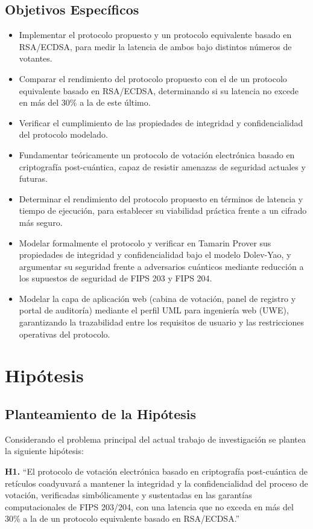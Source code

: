 \subsection{Objetivos Específicos}
\begin{itemize}
	\item Implementar el protocolo propuesto y un protocolo equivalente basado en RSA/ECDSA, para medir la latencia de ambos bajo distintos números de votantes.
	\item Comparar el rendimiento del protocolo propuesto con el de un protocolo equivalente basado en RSA/ECDSA, determinando si su latencia no excede en más del 30\% a la de este último.
	\item Verificar el cumplimiento de las propiedades de integridad y confidencialidad del protocolo modelado.
	\item Fundamentar teóricamente un protocolo de votación electrónica basado en criptografía post-cuántica, capaz de resistir amenazas de seguridad actuales y futuras.
	\item Determinar el rendimiento del protocolo propuesto en términos de latencia y tiempo de ejecución, para establecer su viabilidad práctica frente a un cifrado más seguro.
	\item Modelar formalmente el protocolo y verificar en Tamarin Prover sus propiedades de integridad y confidencialidad bajo el modelo Dolev-Yao, y argumentar su seguridad frente a adversarios cuánticos mediante reducción a los supuestos de seguridad de FIPS 203 y FIPS 204.
	\item Modelar la capa de aplicación web (cabina de votación, panel de registro y portal de auditoría) mediante el perfil UML para ingeniería web (UWE), garantizando la trazabilidad entre los requisitos de usuario y las restricciones operativas del protocolo.
\end{itemize}

\section{Hipótesis}

\subsection{Planteamiento de la Hipótesis}
Considerando el problema principal del actual trabajo de investigación se plantea la siguiente hipótesis:

\textbf{H1.} ``El protocolo de votación electrónica basado en criptografía post-cuántica de retículos coadyuvará a mantener la integridad y la confidencialidad del proceso de votación, verificadas simbólicamente y sustentadas en las garantías computacionales de FIPS 203/204, con una latencia que no exceda en más del 30\% a la de un protocolo equivalente basado en RSA/ECDSA.''

